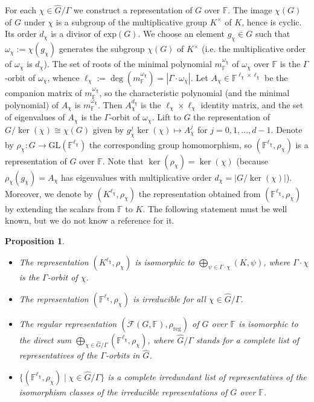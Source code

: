 \documentclass[12pt, oneside]{amsart}
\newtheorem{proposition}[theorem]{\bf Proposition}
\def\field{K}
\def\FF{\mathbb{F}}
\begin{document}
For each $\chi\in\widehat G/\Gamma$ we construct a representation of $G$ over $\FF$. 
The image $\chi(G)$ of $G$ under $\chi$ is a subgroup of the multiplicative group 
$\field^\times$ of $\field$, hence is cyclic. Its order $d_\chi$ is a divisor of $\mathrm{exp}(G)$. 
We 
choose an element $g_\chi\in G$ such that $\omega_\chi:=\chi(g_\chi)$ generates the subgroup $\chi(G)$ 
of $\field^\times$ (i.e. the multiplicative order of $\omega_\chi$ is $d_\chi$). 
The set of roots of 
the minimal polynomial $m^{\omega_\chi}_\FF$ of $\omega_\chi$ over $\FF$ is the 
$\Gamma$-orbit of $\omega_\chi$, whence $\ell_\chi:=\deg(m^{\omega_\chi}_\FF)=|\Gamma\cdot\omega_\chi|$. 
Let $A_\chi\in \FF^{\ell_\chi\times\ell_\chi}$ be the companion matrix of $m^{\omega_\chi}_\FF$, 
so the characteristic polynomial (and the minimal polynomial) of $A_\chi$ is $m^{\omega_\chi}_\FF$. 
Then $A_\chi^{d_\chi}$ is the $\ell_\chi\times\ell_\chi$ identity matrix, and the set of eigenvalues of 
$A_\chi$ is the $\Gamma$-orbit of $\omega_\chi$. 
Lift to $G$ the representation of $G/\ker(\chi)\cong \chi(G)$   given by 
$g_\chi^j\ker(\chi)\mapsto A_\chi^j$ for $j=0,1,\dots,d-1$. 
Denote by $\rho_\chi:G\to \mathrm{GL}(\FF^{\ell_\chi})$ the corresponding group homomorphism, 
so $(\FF^{\ell_\chi},\rho_\chi)$ is a representation of $G$ over $\FF$.  
Note that $\ker(\rho_\chi)=\ker(\chi)$ (because $\rho_\chi(g_\chi)=A_\chi$ has eigenvalues with multiplicative order $d_\chi=|G/\ker(\chi)|$). 
Moreover, we denote by $(\field^{\ell_\chi},\rho_\chi)$ the representation 
obtained from $(\FF^{\ell_\chi},\rho_\chi)$ by extending the scalars from $\FF$ to $\field$. 
The following statement must be well known, but we do not know a reference for it. 

\begin{proposition} \label{prop:irrep abelian} 
\begin{itemize}
\item[(i)] The representation $(\field^{\ell_\chi},\rho_\chi)$ is isomorphic to 
$\bigoplus_{\psi\in \Gamma\cdot\chi} (\field,\psi)$, where $\Gamma\cdot \chi$ is the 
$\Gamma$-orbit of $\chi$. 
\item[(ii)] The representation $(\FF^{\ell_\chi},\rho_\chi)$ is irreducible for all $\chi\in \widehat G/\Gamma$. 
\item[(iii)] The regular representation $(\mathcal{F}(G,\FF),\rho_{\mathrm{reg}})$ of $G$ over $\FF$ 
is isomorphic to the direct sum 
$\bigoplus_{\chi\in \widehat G/\Gamma}(\FF^{\ell_\chi},\rho_\chi)$,  
where $\widehat G/\Gamma$ stands for a complete list of representatives of the $\Gamma$-orbits in $\widehat G$. 
\item[(iv)]  $\{(\FF^{\ell_\chi},\rho_\chi)\mid \chi\in \widehat G/\Gamma\}$  is a complete irredundant list of 
representatives of the isomorphism classes of the irreducible representations of $G$ over $\FF$. 
\end{itemize}  
\end{proposition}
\end{document}
